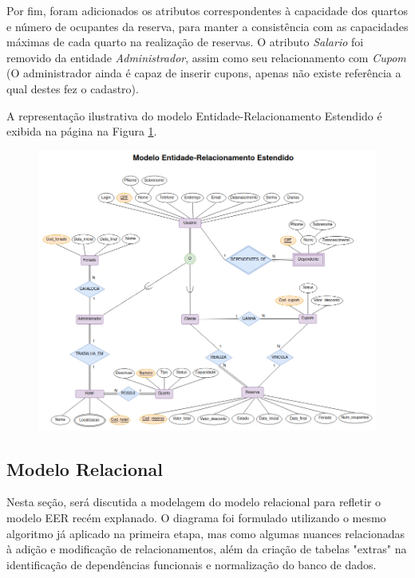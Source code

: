 \documentclass[a4paper, 12pt]{article}
\begin{document}
Por fim, foram adicionados os atributos correspondentes à capacidade dos quartos e número de ocupantes da reserva, para manter a consistência com as capacidades máximas de cada quarto na realização de reservas. O atributo \emph{Salario} foi removido da entidade \emph{Administrador}, assim como seu relacionamento com \emph{Cupom} (O administrador ainda é capaz de inserir cupons, apenas não existe referência a qual destes fez o cadastro).

A representação ilustrativa do modelo Entidade-Relacionamento Estendido é exibida na página \pageref{fig:exampleFig1} na Figura \ref{fig:exampleFig1}.

\begin{figure}
    \centering
    \includegraphics[width=1.1\textwidth]{Images/EER.png}
    \label{fig:exampleFig1}
\end{figure}

\subsection{Modelo Relacional}

Nesta seção, será discutida a modelagem do modelo relacional para refletir o modelo EER recém explanado. O diagrama foi formulado utilizando o mesmo algoritmo já aplicado na primeira etapa, mas como algumas nuances relacionadas à adição e modificação de relacionamentos, além da criação de tabelas "extras" na identificação de dependências funcionais e normalização do banco de dados.
\end{document}
